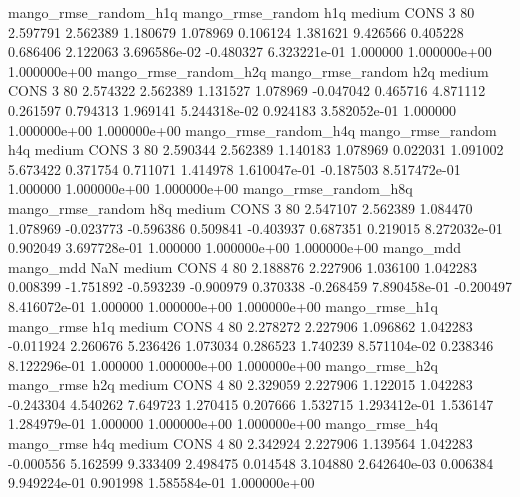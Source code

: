 mango_rmse_random_h1q mango_rmse_random                  h1q     medium     CONS                 3 80  2.597791       2.562389 1.180679       1.078969    0.106124      1.381621      9.426566     0.405228       0.686406  2.122063 3.696586e-02    -0.480327   6.323221e-01            1.000000    1.000000e+00        1.000000e+00
mango_rmse_random_h2q mango_rmse_random                  h2q     medium     CONS                 3 80  2.574322       2.562389 1.131527       1.078969   -0.047042      0.465716      4.871112     0.261597       0.794313  1.969141 5.244318e-02     0.924183   3.582052e-01            1.000000    1.000000e+00        1.000000e+00
mango_rmse_random_h4q mango_rmse_random                  h4q     medium     CONS                 3 80  2.590344       2.562389 1.140183       1.078969    0.022031      1.091002      5.673422     0.371754       0.711071  1.414978 1.610047e-01    -0.187503   8.517472e-01            1.000000    1.000000e+00        1.000000e+00
mango_rmse_random_h8q mango_rmse_random                  h8q     medium     CONS                 3 80  2.547107       2.562389 1.084470       1.078969   -0.023773     -0.596386      0.509841    -0.403937       0.687351  0.219015 8.272032e-01     0.902049   3.697728e-01            1.000000    1.000000e+00        1.000000e+00
            mango_mdd         mango_mdd                  NaN     medium     CONS                 4 80  2.188876       2.227906 1.036100       1.042283    0.008399     -1.751892     -0.593239    -0.900979       0.370338 -0.268459 7.890458e-01    -0.200497   8.416072e-01            1.000000    1.000000e+00        1.000000e+00
       mango_rmse_h1q        mango_rmse                  h1q     medium     CONS                 4 80  2.278272       2.227906 1.096862       1.042283   -0.011924      2.260676      5.236426     1.073034       0.286523  1.740239 8.571104e-02     0.238346   8.122296e-01            1.000000    1.000000e+00        1.000000e+00
       mango_rmse_h2q        mango_rmse                  h2q     medium     CONS                 4 80  2.329059       2.227906 1.122015       1.042283   -0.243304      4.540262      7.649723     1.270415       0.207666  1.532715 1.293412e-01     1.536147   1.284979e-01            1.000000    1.000000e+00        1.000000e+00
       mango_rmse_h4q        mango_rmse                  h4q     medium     CONS                 4 80  2.342924       2.227906 1.139564       1.042283   -0.000556      5.162599      9.333409     2.498475       0.014548  3.104880 2.642640e-03     0.006384   9.949224e-01            0.901998    1.585584e-01        1.000000e+00
